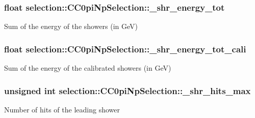 \subsubsection[{\texorpdfstring{\+\_\+shr\+\_\+energy\+\_\+tot}{_shr_energy_tot}}]{\setlength{\rightskip}{0pt plus 5cm}float selection\+::\+C\+C0pi\+Np\+Selection\+::\+\_\+shr\+\_\+energy\+\_\+tot\hspace{0.3cm}{\ttfamily [private]}}\hypertarget{classselection_1_1CC0piNpSelection_a6e42f011e79f646f36df7148907d1b59}{}\label{classselection_1_1CC0piNpSelection_a6e42f011e79f646f36df7148907d1b59}
Sum of the energy of the showers (in GeV) 
\subsubsection[{\texorpdfstring{\+\_\+shr\+\_\+energy\+\_\+tot\+\_\+cali}{_shr_energy_tot_cali}}]{\setlength{\rightskip}{0pt plus 5cm}float selection\+::\+C\+C0pi\+Np\+Selection\+::\+\_\+shr\+\_\+energy\+\_\+tot\+\_\+cali\hspace{0.3cm}{\ttfamily [private]}}\hypertarget{classselection_1_1CC0piNpSelection_aae69f88600d31bb3456808268fb63c1c}{}\label{classselection_1_1CC0piNpSelection_aae69f88600d31bb3456808268fb63c1c}
Sum of the energy of the calibrated showers (in GeV) 
\subsubsection[{\texorpdfstring{\+\_\+shr\+\_\+hits\+\_\+max}{_shr_hits_max}}]{\setlength{\rightskip}{0pt plus 5cm}unsigned int selection\+::\+C\+C0pi\+Np\+Selection\+::\+\_\+shr\+\_\+hits\+\_\+max\hspace{0.3cm}{\ttfamily [private]}}\hypertarget{classselection_1_1CC0piNpSelection_a750834ef52299d85f9596bbbafa1dffb}{}\label{classselection_1_1CC0piNpSelection_a750834ef52299d85f9596bbbafa1dffb}
Number of hits of the leading shower 
